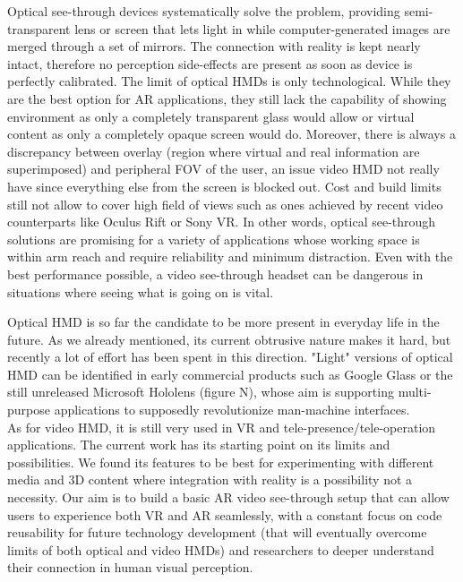 Optical see-through devices systematically solve the problem, providing semi-transparent lens or screen that lets light in while computer-generated images are merged through a set of mirrors. The connection with reality is kept nearly intact, therefore no perception side-effects are present as soon as device is perfectly calibrated. The limit of optical HMDs is only technological. While they are the best option for AR applications, they still lack the capability of showing environment as only a completely transparent glass would allow or virtual content as only a completely opaque screen would do. Moreover, there is always a discrepancy between overlay (region where virtual and real information are superimposed) and peripheral FOV of the user, an issue video HMD not really have since everything else from the screen is blocked out. Cost and build limits still not allow to cover high field of views such as ones achieved by recent video counterparts like Oculus Rift or Sony VR. In other words, optical see-through solutions are promising for a variety of applications whose working space is within arm reach and require reliability and minimum distraction. Even with the best performance possible, a video see-through headset can be dangerous in situations where seeing what is going on is vital.

Optical HMD is so far the candidate to be more present in everyday life in the future. As we already mentioned, its current obtrusive nature makes it hard, but recently a lot of effort has been spent in this direction. "Light" versions of optical HMD can be identified in early commercial products such as Google Glass or the still unreleased Microsoft Hololens (figure N), whose aim is supporting multi-purpose applications to supposedly revolutionize man-machine interfaces.\\
As for video HMD, it is still very used in VR and tele-presence/tele-operation applications. The current work has its starting point on its limits and possibilities. We found its features to be best for experimenting with different media and 3D content where integration with reality is a possibility not a necessity. Our aim is to build a basic AR video see-through setup that can allow users to experience both VR and AR seamlessly, with a constant focus on code reusability for future technology development (that will eventually overcome limits of both optical and video HMDs) and researchers to deeper understand their connection in human visual perception.


